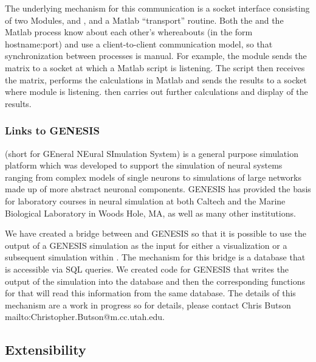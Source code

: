 The underlying mechanism for this communication is a socket interface
consisting of two \SR{} Modules,  and
, and a Matlab ``transport'' routine.  Both the \SR{}
and the Matlab process know about each other's whereabouts (in the form
hostname:port) and use a client-to-client communication model, so that
synchronization between processes is manual.  For example, 
the \SR{}  module sends the matrix to a socket at which a 
Matlab script is listening.  The script then receives the matrix, 
performs the calculations in Matlab and sends the results to a socket 
where  module is listening.  \SR then carries out
further calculations and display of the results.


\subsubsection{Links to GENESIS}

(short for GEneral NEural SImulation System) is a general purpose
simulation platform which was developed to support the simulation of neural
systems ranging from complex models of single neurons to simulations of
large networks made up of more abstract neuronal components. GENESIS has
provided the basis for laboratory courses in neural simulation at both
Caltech and the Marine Biological Laboratory in Woods Hole, MA, as well as
many other institutions.   

We have created a bridge between \SR{} and GENESIS so that it is possible
to use the output of a GENESIS simulation as the input for either a
visualization or a subsequent simulation within \PSE{}.  The mechanism for
this bridge is a database that is accessible via SQL queries.  We created
code for GENESIS that writes the output of the simulation into the database
and then the corresponding functions for \SR{} that will read this
information from the same database.  The details of this mechanism are a
work in progress so for details, please contact Chris Butson
{mailto:Christopher.Butson@m.cc.utah.edu}.

\subsection{Extensibility}
\label{sec:con-extend} 

